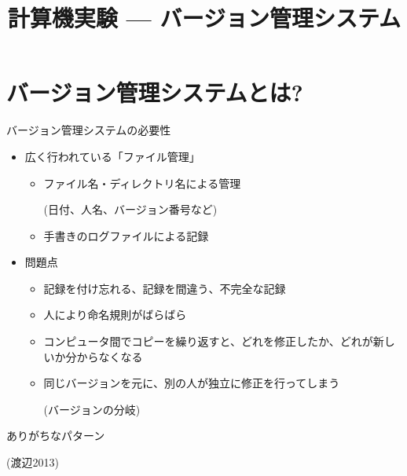 \documentclass[10pt,dvipdfmx]{beamer}
\title{計算機実験 --- バージョン管理システム}
\begin{document}

\begin{frame}
  \titlepage
  \tableofcontents
\end{frame}

\section{バージョン管理システムとは?}

\begin{frame}[t,fragile]{バージョン管理システムの必要性}
  \begin{itemize}
    \setlength{\itemsep}{1em}
  \item 広く行われている「ファイル管理」
    \begin{itemize}
    \item ファイル名・ディレクトリ名による管理

      (日付、人名、バージョン番号など)
    \item 手書きのログファイルによる記録
    \end{itemize}
  \item 問題点
    \begin{itemize}
    \item 記録を付け忘れる、記録を間違う、不完全な記録
    \item 人により命名規則がばらばら
    \item コンピュータ間でコピーを繰り返すと、どれを修正したか、どれが新しいか分からなくなる
    \item 同じバージョンを元に、別の人が独立に修正を行ってしまう

      (バージョンの分岐)
    \end{itemize}
  \end{itemize}
\end{frame}

\begin{frame}[t,fragile]{ありがちなパターン}
  \vspace*{-1.8em}
  \begin{center}
  \end{center}
  \vspace*{-2em}
  {\footnotesize (渡辺2013)}
\end{frame}
\end{document}

